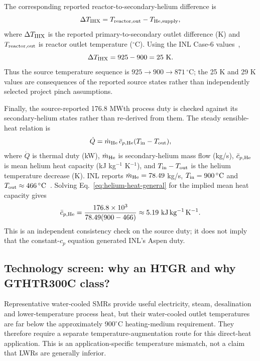 The corresponding reported reactor-to-secondary-helium difference is
\begin{equation}\label{eq:ihx-dt-general}
\Delta T_{\rm IHX}
=T_{\rm reactor,out}-T_{\rm He,supply},
\end{equation}
where $\Delta T_{\rm IHX}$ is the reported primary-to-secondary outlet difference (K) and $T_{\rm reactor,out}$ is reactor outlet temperature ($^{\circ}$C). Using the INL Case-6 values~\cite{inltev961},
\begin{equation}\label{eq:temperature-cascade}
\Delta T_{\rm IHX}=925-900=25~\mathrm K.
\end{equation}
Thus the source temperature sequence is $925\rightarrow900\rightarrow871\,^{\circ}\mathrm C$; the 25 K and 29 K values are consequences of the reported source states rather than independently selected project pinch assumptions.

Finally, the source-reported 176.8 MWth process duty is checked against its secondary-helium states rather than re-derived from them. The steady sensible-heat relation is
\begin{equation}\label{eq:helium-heat-general}
\dot Q=\dot m_{\rm He}\,\bar c_{p,\rm He}
(T_{\rm in}-T_{\rm out}),
\end{equation}
where $\dot Q$ is thermal duty (kW), $\dot m_{\rm He}$ is secondary-helium mass flow (kg/s), $\bar c_{p,\rm He}$ is mean helium heat capacity (kJ kg$^{-1}$ K$^{-1}$), and $T_{\rm in}-T_{\rm out}$ is the helium temperature decrease (K). INL reports $\dot m_{\rm He}=78.49$ kg/s, $T_{\rm in}=900\,^{\circ}\mathrm C$ and $T_{\rm out}\approx466\,^{\circ}\mathrm C$~\cite{inltev961}. Solving Eq.~\ref{eq:helium-heat-general} for the implied mean heat capacity gives
\begin{equation}\label{eq:helium-cp-check}
\bar c_{p,\rm He}
=\frac{176.8\times10^3}
{78.49(900-466)}
\approx5.19~\mathrm{kJ\,kg^{-1}\,K^{-1}}.
\end{equation}
This is an independent consistency check on the source duty; it does not imply that the constant-$c_p$ equation generated INL's Aspen duty.

\subsection{Technology screen: why an HTGR and why GTHTR300C class?}
Representative water-cooled SMRs provide useful electricity, steam, desalination and lower-temperature process heat, but their water-cooled outlet temperatures are far below the approximately 900$^\circ$C heating-medium requirement.  They therefore require a separate temperature-augmentation route for this direct-heat application.  This is an application-specific temperature mismatch, not a claim that LWRs are generally inferior.

